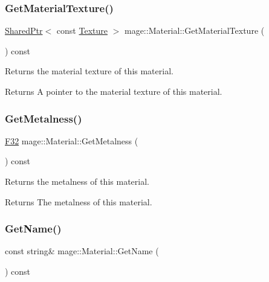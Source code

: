 \subsubsection{\texorpdfstring{Get\+Material\+Texture()}{GetMaterialTexture()}}
{\footnotesize\ttfamily \hyperlink{namespacemage_a1e01ae66713838a7a67d30e44c67703e}{Shared\+Ptr}$<$ const \hyperlink{classmage_1_1_texture}{Texture} $>$ mage\+::\+Material\+::\+Get\+Material\+Texture (\begin{DoxyParamCaption}{ }\end{DoxyParamCaption}) const\hspace{0.3cm}{\ttfamily [noexcept]}}

Returns the material texture of this material.

\begin{DoxyReturn}{Returns}
A pointer to the material texture of this material. 
\end{DoxyReturn}
\hypertarget{structmage_1_1_material_a9d91ff9ce999d24558305f070d0cde93}{}\label{structmage_1_1_material_a9d91ff9ce999d24558305f070d0cde93} 
\subsubsection{\texorpdfstring{Get\+Metalness()}{GetMetalness()}}
{\footnotesize\ttfamily \hyperlink{namespacemage_aa97e833b45f06d60a0a9c4fc22ae02c0}{F32} mage\+::\+Material\+::\+Get\+Metalness (\begin{DoxyParamCaption}{ }\end{DoxyParamCaption}) const\hspace{0.3cm}{\ttfamily [noexcept]}}

Returns the metalness of this material.

\begin{DoxyReturn}{Returns}
The metalness of this material. 
\end{DoxyReturn}
\hypertarget{structmage_1_1_material_a9edb2f437eca07c6c12c24d10ec30eb3}{}\label{structmage_1_1_material_a9edb2f437eca07c6c12c24d10ec30eb3} 
\subsubsection{\texorpdfstring{Get\+Name()}{GetName()}}
{\footnotesize\ttfamily const string\& mage\+::\+Material\+::\+Get\+Name (\begin{DoxyParamCaption}{ }\end{DoxyParamCaption}) const\hspace{0.3cm}{\ttfamily [noexcept]}}


